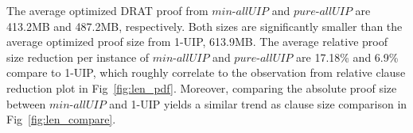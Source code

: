 \documentclass[runningheads]{llncs}
\newcommand{\allUip}{\textit{stable-allUIP}}
\newcommand{\allUipPure}{\textit{pure-allUIP}\xspace}
\newcommand{\allUipMin}{\textit{min-allUIP}\xspace}
\newcommand{\allUipAct}{\textit{allUIP-Active}}
\newcommand{\allUipIn}{\textit{allUIP-Inclusive}}
\newcommand{\allUipEx}{\textit{allUIP-Exclusive}}
\newcommand{\MapleBase}{\textit{MapleCOMSPS\_LRB}}
\newcommand{\MapleIUIPPure}{\text{Maple-\allUipPure}}
\newcommand{\MapleIUIMin}{\text{Maple-\allUipMin}}
\begin{document}
The average optimized DRAT proof from $\allUipMin$ and $\allUipPure$ are 413.2MB and 487.2MB, respectively. Both sizes are significantly smaller than the average optimized proof size from 1-UIP, 613.9MB.  The average relative proof size reduction per instance of $\allUipMin$ and $\allUipPure$ are 17.18\% and 6.9\% compare to 1-UIP, which roughly correlate to the observation from relative clause reduction plot in Fig~\ref{fig:len_pdf}. Moreover, comparing the absolute proof size between $\allUipMin$ and 1-UIP yields a similar trend as clause size comparison in Fig~\ref{fig:len_compare}.  




\end{document}
